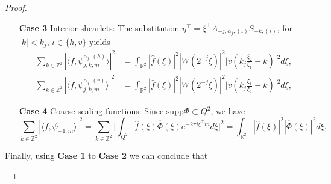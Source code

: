\begin{proof}
\begin{itemize}
\begin{enumerate}
\item[\textbf{Case 3}] Interior shearlets: The substitution $\eta^{\top}=\xi^{\top}A_{-j,\alpha_j,(\iota)}S_{-k,(\iota)}$, for $|k|<k_j$, $\iota\in\{h,v\}$ yields
$$
\begin{aligned}
\sum_{k\in\mathbb{Z}^2}|\langle f,\psi_{j,k,m}^{\alpha_j,(h)}\rangle |^2 &= \int_{\mathbb{R}^2}|\hat{f}(\xi)|^2|W(2^{-j}\xi)|^2 \bigg|v\left(k_j\frac{\xi_2}{\xi_1}-k\right)\bigg|^2d\xi,\\
\sum_{k\in\mathbb{Z}^2}|\langle f,\psi_{j,k,m}^{\alpha_j,(v)}\rangle |^2 &= \int_{\mathbb{R}^2}|\hat{f}(\xi)|^2|W(2^{-j}\xi)|^2\bigg|v\left(k_j\frac{\xi_1}{\xi_2}-k\right)\bigg|^2d\xi,
\end{aligned}
$$

\item[\textbf{Case 4}] Coarse scaling functions: Since $\text{supp}\Phi\subset Q^2$, we have
$$
\sum_{k\in\mathbb{Z}^2}|\langle f,\psi_{-1,m}\rangle|^2=\sum_{k\in\mathbb{Z}^2}\bigg| \int_{Q^2}\hat{f}(\xi)\hat{\Phi}(\xi) e^{-2\pi i\xi^{\top}m}d\xi\bigg|^2 = \int_{\mathbb{R}^2}|\hat{f}(\xi)|^2|\hat{\Phi}(\xi)|^2d\xi.
$$
\end{enumerate}
Finally, using \textbf{Case 1} to \textbf{Case 2} we can conclude that 


\end{itemize}
\end{proof}
